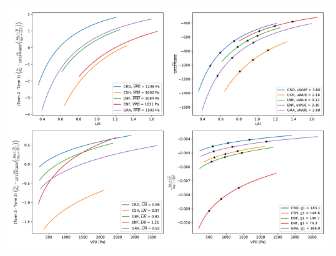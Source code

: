 \documentclass[draft,linenumbers]{agujournal}
\begin{document}
\begin{figure}[h]
\centering
\includegraphics[width=20pc]{./fig06.pdf}
\caption{}
\label{term3_between}
\end{figure}




 \begin{linenomath*}
 \begin{equation}
 \end{equation}
 \end{linenomath*}


%
%
%
%
%
%
%
%
\end{document}
